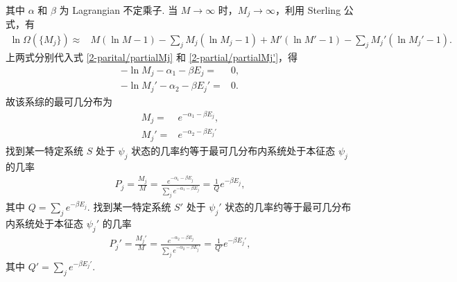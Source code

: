 \documentclass{assignment}
\begin{document}
\begin{pf}
\begin{align}
    \end{align}
    其中 $\alpha$ 和 $\beta$ 为 Lagrangian 不定乘子.
    当 $M\rightarrow\infty$ 时，$M_j\rightarrow\infty$，利用 Sterling 公式，有
    \begin{align}
        \ln\Omega(\{M_j\})\approx&M(\ln M-1)-\sum_jM_j(\ln M_j-1)+M'(\ln M'-1)-\sum_jM_j'(\ln M_j'-1).
    \end{align}
    上两式分别代入式 \eqref{2-parital/partialMj} 和 \eqref{2-partial/partialMj'}，得
    \begin{align}
        -\ln M_j-\alpha_1-\beta E_j=&0,\\
        -\ln M_j'-\alpha_2-\beta E_j'=&0.
    \end{align}
    故该系综的最可几分布为
    \begin{align}
        M_j=&e^{-\alpha_1-\beta E_j},\\
        M_j'=&e^{-\alpha_2-\beta E_j'}
    \end{align}
    找到某一特定系统 $S$ 处于 $\psi_j$ 状态的几率约等于最可几分布内系统处于本征态 $\psi_j$ 的几率
    \begin{align}
        P_j=\frac{M_j}{M}=\frac{e^{-\alpha_1-\beta E_j}}{\sum_je^{-\alpha_1-\beta E_j}}=\frac{1}{Q}e^{-\beta E_j},
    \end{align}
    其中 $Q=\sum_je^{-\beta E_j}$.
    找到某一特定系统 $S'$ 处于 $\psi_j'$ 状态的几率约等于最可几分布内系统处于本征态 $\psi_j'$ 的几率
    \begin{align}
        P_j'=\frac{M_j'}{M}=\frac{e^{-\alpha_2-\beta E_j}}{\sum_je^{-\alpha_2-\beta E_j'}}=\frac{1}{Q'}e^{-\beta E_j'},
    \end{align}
    其中 $Q'=\sum_je^{-\beta E_j'}$.
\end{pf}
\end{document}
